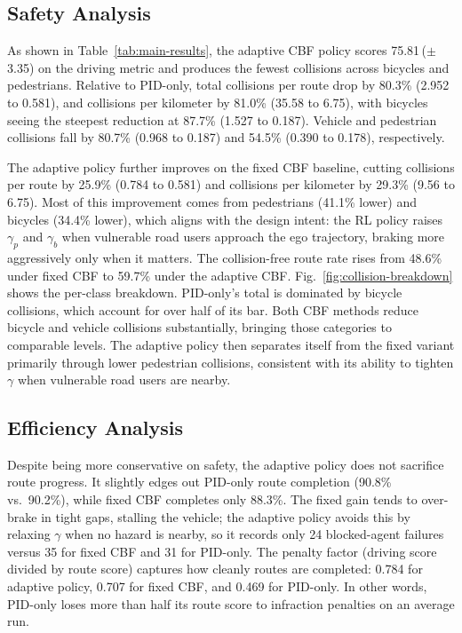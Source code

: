 \subsection{Safety Analysis}

As shown in Table~\ref{tab:main-results}, the adaptive CBF policy scores 75.81\,($\pm$\,3.35) on the driving metric and produces the fewest collisions across bicycles and pedestrians. Relative to PID-only, total collisions per route drop by 80.3\% (2.952 to 0.581), and collisions per kilometer by 81.0\% (35.58 to 6.75), with bicycles seeing the steepest reduction at 87.7\% (1.527 to 0.187). Vehicle and pedestrian collisions fall by 80.7\% (0.968 to 0.187) and 54.5\% (0.390 to 0.178), respectively.


The adaptive policy further improves on the fixed CBF baseline, cutting collisions per route by 25.9\% (0.784 to 0.581) and collisions per kilometer by 29.3\% (9.56 to 6.75). Most of this improvement comes from pedestrians (41.1\% lower) and bicycles (34.4\% lower), which aligns with the design intent: the RL policy raises $\gamma_p$ and $\gamma_b$ when vulnerable road users approach the ego trajectory, braking more aggressively only when it matters. The collision-free route rate rises from 48.6\% under fixed CBF to 59.7\% under the adaptive CBF. Fig.~\ref{fig:collision-breakdown} shows the per-class breakdown. PID-only's total is dominated by bicycle collisions, which account for over half of its bar. Both CBF methods reduce bicycle and vehicle collisions substantially, bringing those categories to comparable levels. The adaptive policy then separates itself from the fixed variant primarily through lower pedestrian collisions, consistent with its ability to tighten $\gamma$ when vulnerable road users are nearby.


\subsection{Efficiency Analysis}

Despite being more conservative on safety, the adaptive policy does not sacrifice route progress. It slightly edges out PID-only route completion (90.8\% vs.\ 90.2\%), while fixed CBF completes only 88.3\%. The fixed gain tends to over-brake in tight gaps, stalling the vehicle; the adaptive policy avoids this by relaxing $\gamma$ when no hazard is nearby, so it records only 24 blocked-agent failures versus 35 for fixed CBF and 31 for PID-only. The penalty factor (driving score divided by route score) captures how cleanly routes are completed: 0.784 for adaptive policy, 0.707 for fixed CBF, and 0.469 for PID-only. In other words, PID-only loses more than half its route score to infraction penalties on an average run.


